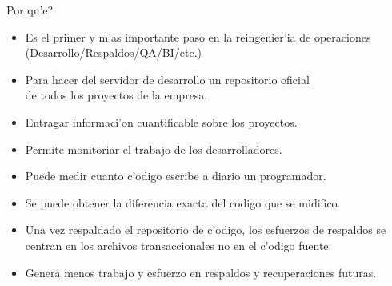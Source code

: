 \documentclass[xcolor=dvipsnames]{beamer}
\begin{document}
	\begin{frame}{Por qu'e?}
	{
	\begin{itemize}
	\item Es el primer y m'as importante paso en la reingenier'{i}a de 
			operaciones (Desarrollo/Respaldos/QA/BI/etc.)
	\item Para hacer del servidor de desarrollo un repositorio oficial \\
			de todos los proyectos de la empresa.
	\item Entragar informaci'on cuantificable sobre los proyectos.
	\item Permite monitoriar el trabajo de los desarrolladores.
	\item Puede medir cuanto c'odigo escribe a diario un programador.
	\item Se puede obtener la diferencia exacta del codigo que se midifico.
	\item Una vez respaldado el repositorio de c'odigo, los esfuerzos de 
		  respaldos se centran en los archivos transaccionales no en el c'odigo fuente.
	\item Genera menos trabajo y esfuerzo en respaldos y recuperaciones futuras.
	\end{itemize}
	}
	\end{frame}
	
\end{document}
